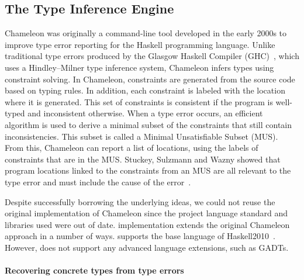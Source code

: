 \subsection{The Type Inference Engine}
\label{sec:typeinferenceengine}

Chameleon was originally a command-line tool developed in the early 2000s to improve type error reporting %
for the Haskell programming language.
Unlike traditional type errors produced by the Glasgow Haskell Compiler (GHC)~\cite{Gamari_undated-zu}, which uses a Hindley–Milner type inference system, Chameleon infers types using constraint solving. In Chameleon, constraints are generated from the source code based on typing rules. In addition, each constraint is labeled with the location where it is generated. This set of constraints is consistent if the program is well-typed and inconsistent otherwise. When a type error occurs, an efficient algorithm is used to derive a minimal subset of the constraints that still contain inconsistencies. This subset is called a Minimal Unsatisfiable Subset (MUS). From this, Chameleon can report a list of locations, using the labels of constraints that are in the MUS. Stuckey, Sulzmann and Wazny showed that program locations linked to the constraints from an MUS are all relevant to the type error and must include the cause of the error~\cite{Stuckey2003-pz}.

Despite successfully borrowing the underlying ideas, we could not reuse the original implementation of Chameleon since the project language standard and libraries used were out of date. 
\chameleon{} implementation extends the original Chameleon approach in a number of ways. \chameleon{} supports the base language of Haskell2010~\cite{Simon_Marlow2010-lg}. However, \chameleon{} does not support any advanced language extensions, such as GADTs.



\paragraph{Recovering concrete types from type errors}


